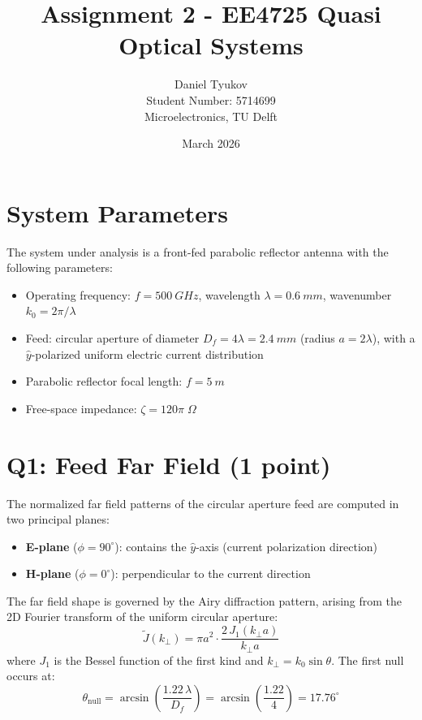 \documentclass{article}
\title{Assignment 2 - EE4725 Quasi Optical Systems}
\author{Daniel Tyukov \\ Student Number: 5714699 \\ Microelectronics, TU Delft}
\date{March 2026}
\begin{document}
\maketitle

\tableofcontents
\newpage

\section{System Parameters}

The system under analysis is a front-fed parabolic reflector antenna with the following parameters:
\begin{itemize}
\item Operating frequency: $f = \SI{500}{GHz}$, wavelength $\lambda = \SI{0.6}{mm}$, wavenumber $k_0 = 2\pi/\lambda$
\item Feed: circular aperture of diameter $D_f = 4\lambda = \SI{2.4}{mm}$ (radius $a = 2\lambda$), with a $\hat{y}$-polarized uniform electric current distribution
\item Parabolic reflector focal length: $f = \SI{5}{m}$
\item Free-space impedance: $\zeta = 120\pi\;\Omega$
\end{itemize}

\section{Q1: Feed Far Field (1 point)}

The normalized far field patterns of the circular aperture feed are computed in two principal planes:
\begin{itemize}
\item \textbf{E-plane} ($\phi=90^\circ$): contains the $\hat{y}$-axis (current polarization direction)
\item \textbf{H-plane} ($\phi=0^\circ$): perpendicular to the current direction
\end{itemize}

The far field shape is governed by the Airy diffraction pattern, arising from the 2D Fourier transform of the uniform circular aperture:
\begin{equation}
\tilde{J}(k_\perp) = \pi a^2 \cdot \frac{2\,J_1(k_\perp a)}{k_\perp a}
\end{equation}
where $J_1$ is the Bessel function of the first kind and $k_\perp = k_0\sin\theta$. The first null occurs at:
\begin{equation}
\theta_{\text{null}} = \arcsin\!\left(\frac{1.22\,\lambda}{D_f}\right) = \arcsin\!\left(\frac{1.22}{4}\right) = 17.76^\circ
\end{equation}
\end{document}
